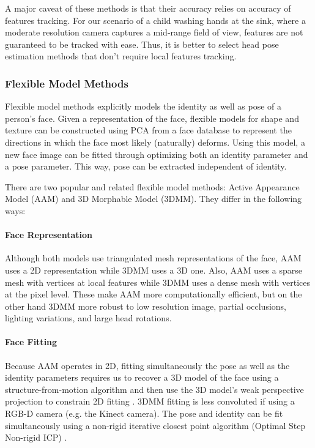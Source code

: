 \documentclass{ut-thesis}
\begin{document}
A major caveat of these methods is that their accuracy relies on accuracy of features tracking.  For our scenario of a child washing hands at the sink, where a moderate resolution camera captures a mid-range field of view, features are not guaranteed to be tracked with ease.  Thus, it is better to select head pose estimation methods that don't require local features tracking.


\subsubsection{Flexible Model Methods}
Flexible model methods explicitly models the identity as well as pose of a person's face.  Given a representation of the face, flexible models for shape and texture can be constructed using PCA from a face database to represent the directions in which the face most likely (naturally) deforms.  Using this model, a new face image can be fitted through optimizing both an identity parameter and a pose parameter.  This way, pose can be extracted independent of identity.


There are two popular and related flexible model methods: Active Appearance Model (AAM) and 3D Morphable Model (3DMM).  They differ in the following ways:

\paragraph{Face Representation}
Although both models use triangulated mesh representations of the face, AAM uses a 2D representation while 3DMM uses a 3D one.  Also, AAM uses a sparse mesh with vertices at local features while 3DMM uses a dense mesh with vertices at the pixel level.  These make AAM more computationally efficient, but on the other hand 3DMM more robust to low resolution image, partial occlusions, lighting variations, and large head rotations.


\paragraph{Face Fitting}
Because AAM operates in 2D, fitting simultaneously the pose as well as the identity parameters requires us to recover a 3D model of the face using a structure-from-motion algorithm and then use the 3D model's weak perspective projection to constrain 2D fitting \cite{xiao2004real}.  3DMM fitting is less convoluted if using a RGB-D camera (e.g. the Kinect camera).  The pose and identity can be fit simultaneously using a non-rigid iterative closest point algorithm (Optimal Step Non-rigid ICP) \cite{paysan20093d}.
\end{document}
